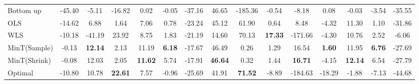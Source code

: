 \documentclass[12pt]{article}
\theoremstyle{definition}
\begin{document}
\begin{table}[H]
{\begin{tabular}{lcccccccccccccc}
			Bottom up & -45.40 & -5.11 & -16.82 & 0.02 & -0.05 & -37.16 & 46.65 & -185.36 & -0.54 & -8.18 & 0.08 & -0.03 & -3.54 & -35.55\\
			OLS & -14.62 & 6.88 & 1.64 & 7.06 & 0.78 & -23.24 & 45.12 & 61.90 & 0.64 & 8.48 & -4.32 & 11.30 & 1.10 & -31.86\\
			WLS & -10.18 & -41.19 & 23.92 & 8.75 & 1.83 & -21.19 & 14.60 & 70.13 & \textbf{17.33} & -171.66 & -4.30 & 10.76 & 2.52 & -6.06\\
			MinT(Sample) & -0.13 & \textbf{12.14} & 2.13 & 11.19 & \textbf{6.18} & -17.67 & 46.49 & 0.26 & 1.29 & 16.54 & \textbf{1.60} & 11.95 & \textbf{6.76} & -27.69\\
			MinT(Shrink) & -0.08 & 12.03 & 2.05 & \textbf{11.62} & 5.74 & -17.91 & \textbf{46.64} & 0.32 & 1.44 & \textbf{16.71} & -4.15 & \textbf{12.14} & 6.54 & -27.79\\
			Optimal & -10.80 & 10.78 & \textbf{22.61} & 7.57 & -0.96 & -25.69 & 41.91 & \textbf{71.52} & -8.89 & -184.63 & -18.29 & -1.88 & -7.13 & -44.68\\
			\bottomrule
		\end{tabular}
	}
\end{table}
\end{document}
